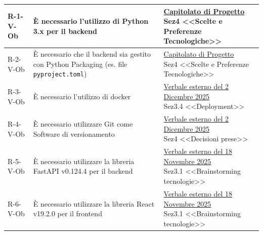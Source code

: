 ﻿\documentclass[a4paper,12pt]{article}
\begin{document}
{{\begin{longtable}{|l|p{0.4\textwidth}|p{7.5cm}|}
            \hline
            \endlastfoot
            \hline
            \hline
            R-1-V-Ob        & È necessario l'utilizzo di Python 3.x per il backend                                            & \parbox[t]{\linewidth}{\href{https://www.math.unipd.it/~tullio/IS-1/2025/Progetto/C1.pdf}{Capitolato di Progetto}                                                 \\ Sez4 <<Scelte e Preferenze Tecnologiche>>} \\
            \hline
            R-2-V-Ob        & È necessario che il backend sia gestito con Python Packaging (es. file \texttt{pyproject.toml}) & \parbox[t]{\linewidth}{\href{https://www.math.unipd.it/~tullio/IS-1/2025/Progetto/C1.pdf}{Capitolato di Progetto}                                                 \\ Sez4 <<Scelte e Preferenze Tecnologiche>>} \\
            \hline
            R-3-V-Ob        & È necessario l'utilizzo di docker                                                               & \parbox[t]{\linewidth}{\href{https://atlasteam9.github.io/Atlas/docs/RTB/verbali/esterni/firmati/VE-2025-12-02-firmato.pdf}{Verbale esterno del 2 Dicembre 2025}  \\ Sez3.4 <<Deployment>>} \\
            \hline
            R-4-V-Ob        & È necessario utilizzare Git come Software di versionamento                                      & \parbox[t]{\linewidth}{\href{https://atlasteam9.github.io/Atlas/docs/RTB/verbali/esterni/firmati/VE-2025-12-02-firmato.pdf}{Verbale esterno del 2 Dicembre 2025}  \\ Sez4 <<Decisioni prese>>} \\
            \hline
            R-5-V-Ob        & È necessario utilizzare la libreria FastAPI v0.124.4 per il backend                             & \parbox[t]{\linewidth}{\href{https://atlasteam9.github.io/Atlas/docs/RTB/verbali/esterni/firmati/VE-2025-11-18-firmato.pdf}{Verbale esterno del 18 Novembre 2025} \\ Sez3.1 <<Brainstorming tecnologie>>} \\
            \hline
            \hline
            R-6-V-Ob        & È necessario utilizzare la libreria React v19.2.0 per il frontend                               & \parbox[t]{\linewidth}{\href{https://atlasteam9.github.io/Atlas/docs/RTB/verbali/esterni/firmati/VE-2025-11-18-firmato.pdf}{Verbale esterno del 18 Novembre 2025} \\ Sez3.1 <<Brainstorming tecnologie>>} \\
        \end{longtable}
    }

}
\end{document}
